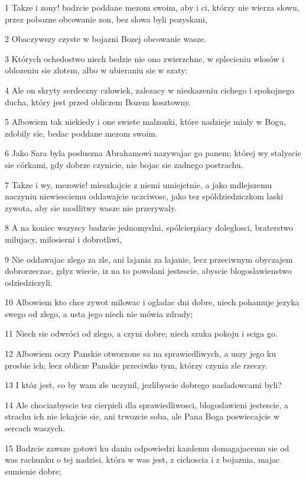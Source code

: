 \par 1 Takze i zony! badzcie poddane mezom swoim, aby i ci, którzy nie wierza slowu, przez pobozne obcowanie zon, bez slowa byli pozyskani,
\par 2 Obaczywszy czyste w bojazni Bozej obcowanie wasze.
\par 3 Których ochedostwo niech bedzie nie ono zwierzchne, w splecieniu wlosów i oblozeniu sie zlotem, albo w ubieraniu sie w szaty:
\par 4 Ale on skryty serdeczny czlowiek, zalezacy w nieskazeniu cichego i spokojnego ducha, który jest przed obliczem Bozem kosztowny.
\par 5 Albowiem tak niekiedy i one swiete malzonki, które nadzieje mialy w Bogu, zdobily sie, bedac poddane mezom swoim.
\par 6 Jako Sara byla posluszna Abrahamowi nazywajac go panem; której wy stalyscie sie córkami, gdy dobrze czynicie, nie bojac sie zadnego postrachu.
\par 7 Takze i wy, mezowie! mieszkajcie z niemi umiejetnie, a jako mdlejszemu naczyniu niewiesciemu oddawajcie uczciwosc, jako tez spóldziedziczkom laski zywota, aby sie modlitwy wasze nie przerywaly.
\par 8 A na koniec wszyscy badzcie jednomyslni, spólcierpiacy doleglosci, braterstwo milujacy, milosierni i dobrotliwi,
\par 9 Nie oddawajac zlego za zle, ani lajania za lajanie, lecz przeciwnym obyczajem dobrorzeczac, gdyz wiecie, iz na to powolani jestescie, abyscie blogoslawienstwo odziedziczyli.
\par 10 Albowiem kto chce zywot milowac i ogladac dni dobre, niech pohamuje jezyka swego od zlego, a usta jego niech nie mówia zdrady;
\par 11 Niech sie odwróci od zlego, a czyni dobre; niech szuka pokoju i sciga go.
\par 12 Albowiem oczy Panskie otworzone sa na sprawiedliwych, a uszy jego ku prosbie ich; lecz oblicze Panskie przeciwko tym, którzy czynia zle rzeczy.
\par 13 I któz jest, co by wam zle uczynil, jezlibyscie dobrego nasladowcami byli?
\par 14 Ale chociazbyscie tez cierpieli dla sprawiedliwosci, blogoslawieni jestescie, a strachu ich nie lekajcie sie, ani trwozcie soba, ale Pana Boga poswiecajcie w sercach waszych.
\par 15 Badzcie zawsze gotowi ku daniu odpowiedzi kazdemu domagajacemu sie od was rachunku o tej nadziei, która w was jest, z cichoscia i z bojaznia, majac sumienie dobre;
